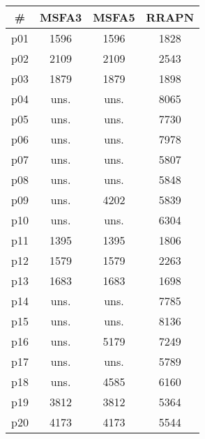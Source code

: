 \begin{tabular}{c||c|c|c}
\textbf{\#} & \textbf{MSFA3} & \textbf{MSFA5} & \textbf{RRAPN}\\
\hline
\hline
p01 & 1596 & 1596 & 1828\\
p02 & 2109 & 2109 & 2543\\
p03 & 1879 & 1879 & 1898\\
p04 & uns. & uns. & 8065\\
p05 & uns. & uns. & 7730\\
p06 & uns. & uns. & 7978\\
p07 & uns. & uns. & 5807\\
p08 & uns. & uns. & 5848\\
p09 & uns. & 4202 & 5839\\
p10 & uns. & uns. & 6304\\
p11 & 1395 & 1395 & 1806\\
p12 & 1579 & 1579 & 2263\\
p13 & 1683 & 1683 & 1698\\
p14 & uns. & uns. & 7785\\
p15 & uns. & uns. & 8136\\
p16 & uns. & 5179 & 7249\\
p17 & uns. & uns. & 5789\\
p18 & uns. & 4585 & 6160\\
p19 & 3812 & 3812 & 5364\\
p20 & 4173 & 4173 & 5544\\
\end{tabular}

